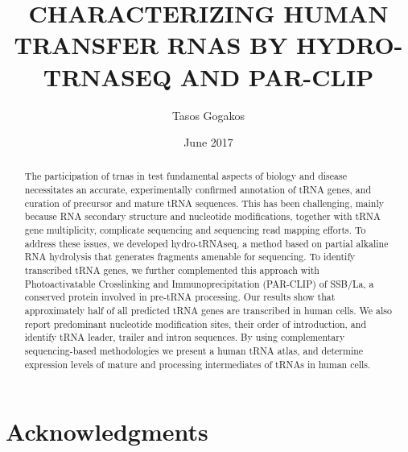\documentclass[12pt]{rockefeller}
\begin{document}
\author{Tasos Gogakos}
\title{\MakeUppercase{Characterizing human transfer rnas by hydro-trnaseq and par-clip}}
\date{June 2017}

\maketitle

\thispagestyle{empty}
\makecopyright

\begin{abstract}

The participation of \glspl{trna} in \gls{test} fundamental aspects of biology and disease necessitates an accurate, experimentally confirmed annotation of tRNA genes, and curation of precursor and mature tRNA sequences. This has been challenging, mainly because RNA secondary structure and nucleotide modifications, together with tRNA gene multiplicity, complicate sequencing and sequencing read mapping efforts. To address these issues, we developed hydro-tRNAseq, a method based on partial alkaline RNA hydrolysis that generates fragments amenable for sequencing. To identify transcribed tRNA genes, we further complemented this approach with Photoactivatable Crosslinking and Immunoprecipitation (PAR-CLIP) of SSB/La, a conserved protein involved in pre-tRNA processing. Our results show that approximately half of all predicted tRNA genes are transcribed in human cells. We also report predominant nucleotide modification sites, their order of introduction, and identify tRNA leader, trailer and intron sequences. By using complementary sequencing-based methodologies we present a human tRNA atlas, and determine expression levels of mature and processing intermediates of tRNAs in human cells.
\end{abstract}


\chapter*{} %
\addtocounter{page}{2} %
\vspace{3in} %
\begin{flushright} %
\end{flushright}

\chapter*{Acknowledgments} %
\end{document}
